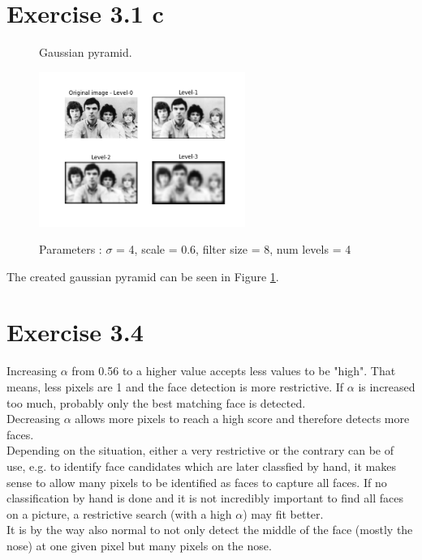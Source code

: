 \documentclass[a4paper,8pt]{extarticle}\usepackage[]{graphicx}\usepackage[]{color}
\begin{document}
\section{Exercise 3.1 c}
\begin{figure}
  \caption{Gaussian pyramid.}
  \centering
    \includegraphics[width=0.6\textwidth]{figs/gaussian.png}
  \label{fig:gauss}
  \caption{Parameters : $\sigma$ = 4, scale = 0.6, filter size = 8, num levels = 4}
\end{figure}
The created gaussian pyramid can be seen in Figure \ref{fig:gauss}. 

\section{Exercise 3.4}
Increasing $\alpha$ from 0.56 to a higher value accepts less values to be "high". That means, less pixels are 1 and the face detection is more restrictive. If $\alpha$ is increased too much, probably only the best matching face is detected. \\
Decreasing $\alpha$ allows more pixels to reach a high score and therefore detects more faces. \\
Depending on the situation, either a very restrictive or the contrary can be of use, e.g. to identify face candidates which are later classfied by hand, it makes sense to allow many pixels to be identified as faces to capture all faces. If no classification by hand is done and it is not incredibly important to find all faces on a picture, a restrictive search (with a high $\alpha$) may fit better. \\
It is by the way also normal to not only detect the middle of the face (mostly the nose) at one given pixel but many pixels on the nose.
\end{document}
